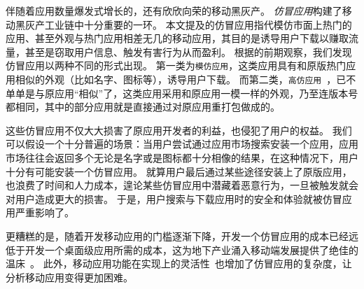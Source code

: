 伴随着应用数量爆发式增长的，还有欣欣向荣的移动黑灰产。
\emph{仿冒应用}构建了移动黑灰产工业链中十分重要的一环。
本文提及的仿冒应用指代模仿市面上热门的应用、甚至外观与热门应用相差无几的移动应用，其目的是诱导用户下载以赚取流量，甚至是窃取用户信息、触发有害行为从而盈利。
根据的前期观察，我们发现仿冒应用以两种不同的形式出现。
第一类为\texttt{模仿应用}，这类应用具有和原版热门应用相似的外观（比如名字、图标等），诱导用户下载。
而第二类，\texttt{高仿应用}~\cite{Andow2016ASO, luo2016repackage}，已不单单是与原应用``相似''了，这类应用采用和原应用一模一样的外观，乃至连版本号都相同，其中的部分应用就是直接通过对原应用重打包做成的。

这些仿冒应用不仅大大损害了原应用开发者的利益，也侵犯了用户的权益。
我们可以假设一个十分普遍的场景：当用户尝试通过应用市场搜索安装一个应用，应用市场往往会返回多个无论是名字或是图标都十分相像的结果，在这种情况下，用户十分有可能安装一个仿冒应用。
就算用户最后通过某些途径安装上了原版应用，也浪费了时间和人力成本，遑论某些仿冒应用中潜藏着恶意行为，一旦被触发就会对用户造成更大的损害。
于是，用户搜索与下载应用时的安全和体验就被仿冒应用严重影响了。

更糟糕的是，随着开发移动应用的门槛逐渐下降，开发一个仿冒应用的成本已经远低于开发一个桌面级应用所需的成本，这为地下产业涌入移动端发展提供了绝佳的温床~\cite{wasserman2010software}。
此外，移动应用功能在实现上的灵活性~\cite{storydroid}也增加了仿冒应用的复杂度，让分析移动应用变得更加困难。


